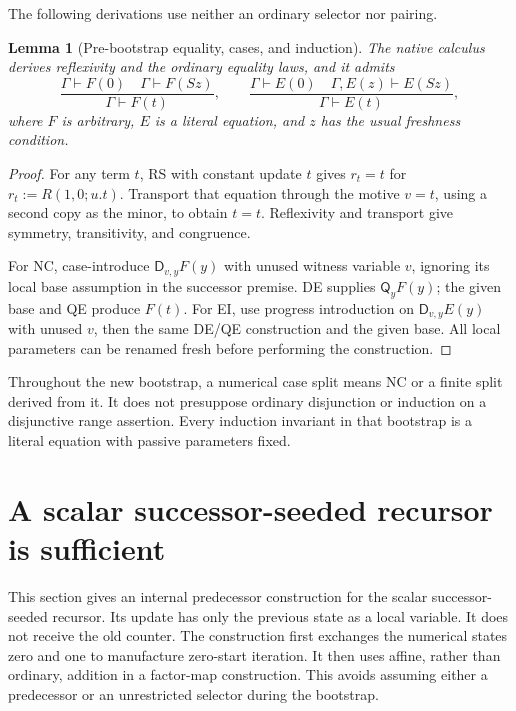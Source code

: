 \documentclass[11pt,letterpaper]{article}
\newtheorem{lemma}[theorem]{Lemma}
\theoremstyle{definition}\newtheorem{definition}[theorem]{Definition}
\theoremstyle{remark}\newtheorem{remark}[theorem]{Remark}
\newcommand{\D}{\mathsf D}
\newcommand{\Q}{\mathsf Q}
\begin{document}
The following derivations use neither an ordinary selector nor pairing.

\begin{lemma}[Pre-bootstrap equality, cases, and induction]
The native calculus derives reflexivity and the ordinary equality laws,
and it admits
\[
 \frac{\Gamma\vdash F(0)\quad\Gamma\vdash F(Sz)}
      {\Gamma\vdash F(t)},\qquad
 \frac{\Gamma\vdash E(0)\quad\Gamma,E(z)\vdash E(Sz)}
      {\Gamma\vdash E(t)},
 \tag{NC, EI}\label{eq:nc-ei}
\]
where $F$ is arbitrary, $E$ is a literal equation, and $z$ has the usual
freshness condition.
\end{lemma}
\begin{proof}
For any term $t$, RS with constant update $t$ gives
$r_t=t$ for $r_t:=R(1,0;u.t)$. Transport that equation through the
motive $v=t$, using a second copy as the minor, to obtain $t=t$.
Reflexivity and transport give symmetry, transitivity, and congruence.

For NC, case-introduce $\D_{v,y}F(y)$ with unused witness variable $v$,
ignoring its local base assumption in the successor premise. DE supplies
$\Q_yF(y)$; the given base and QE produce $F(t)$. For EI, use progress
introduction on $\D_{v,y}E(y)$ with unused $v$, then the same DE/QE
construction and the given base. All local parameters can be renamed
fresh before performing the construction.
\end{proof}

Throughout the new bootstrap, a numerical case split means NC or a
finite split derived from it. It does not presuppose ordinary disjunction
or induction on a disjunctive range assertion. Every induction invariant
in that bootstrap is a literal equation with passive parameters fixed.

\section{A scalar successor-seeded recursor is sufficient}
\label{sec:scalar-successor-bootstrap}\label{sec:hybrid-bootstrap}

This section gives an internal predecessor construction for the scalar
successor-seeded recursor.  Its update has only the previous state as a
local variable.  It does not receive the old counter.  The construction
first exchanges the numerical states zero and one to manufacture
zero-start iteration.  It then uses affine, rather than ordinary,
addition in a factor-map construction.  This avoids assuming either a
predecessor or an unrestricted selector during the bootstrap.
\end{document}
